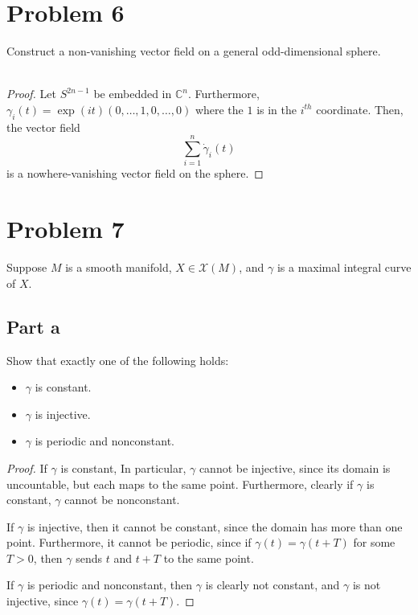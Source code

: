 \documentclass[fontsize=11pt]{scrartcl} %
\numberwithin{equation}{section} %
\numberwithin{figure}{section} %
\numberwithin{table}{section} %
\newcommand{\C}{\mathbb{C}}
\begin{document}
\section*{Problem 6}
Construct a non-vanishing vector field on a general odd-dimensional sphere.
\\
\\
\begin{proof}
    Let $S^{2n-1}$ be embedded in $\C^n$. Furthermore,
    $\gamma_i(t) = \exp(it)(0,\ldots,1,0,\ldots,0)$ where the $1$ is in the
    $i^{th}$ coordinate. Then, the vector field
    \[
        \sum_{i=1}^n \dot{\gamma}_i(t)
    \]
    is a nowhere-vanishing vector field on the sphere.
\end{proof}

\section*{Problem 7} %
Suppose $M$ is a smooth manifold, $X\in \mathcal{X}(M)$, and $\gamma$ is a
maximal integral curve of $X$.
\subsection*{Part a}
Show that exactly one of the following holds:
\begin{itemize}
    \item $\gamma$ is constant.
    \item $\gamma$ is injective.
    \item $\gamma$ is periodic and nonconstant.
\end{itemize}
\begin{proof}
    If $\gamma$ is constant, In particular, $\gamma$ cannot be injective, since
    its domain is uncountable, but each maps to the same point. Furthermore,
    clearly if $\gamma$ is constant, $\gamma$ cannot be nonconstant.

    If $\gamma$ is injective, then it cannot be constant, since the domain has
    more than one point. Furthermore, it cannot be periodic, since if $\gamma(t)
    = \gamma(t+T)$ for some $T>0$, then $\gamma$ sends $t$ and $t+T$ to the
    same point.

    If $\gamma$ is periodic and nonconstant, then $\gamma$ is clearly not
    constant, and $\gamma$ is not injective, since $\gamma(t) = \gamma(t+T)$.
\end{proof}
\end{document}
